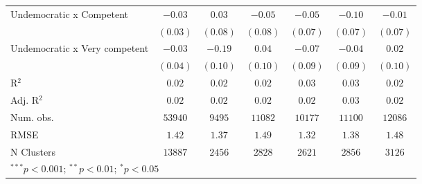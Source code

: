 \begin{table}[!htbp]
\begin{center}
\begin{tabular}{l c c c c c c}
Undemocratic x Competent        & $-0.03$       & $0.03$        & $-0.05$       & $-0.05$       & $-0.10$       & $-0.01$       \\
                                & $(0.03)$      & $(0.08)$      & $(0.08)$      & $(0.07)$      & $(0.07)$      & $(0.07)$      \\
Undemocratic x Very competent   & $-0.03$       & $-0.19$       & $0.04$        & $-0.07$       & $-0.04$       & $0.02$        \\
                                & $(0.04)$      & $(0.10)$      & $(0.10)$      & $(0.09)$      & $(0.09)$      & $(0.10)$      \\
\hline
R$^2$                           & $0.02$        & $0.02$        & $0.02$        & $0.03$        & $0.03$        & $0.02$        \\
Adj. R$^2$                      & $0.02$        & $0.02$        & $0.02$        & $0.02$        & $0.03$        & $0.02$        \\
Num. obs.                       & $53940$       & $9495$        & $11082$       & $10177$       & $11100$       & $12086$       \\
RMSE                            & $1.42$        & $1.37$        & $1.49$        & $1.32$        & $1.38$        & $1.48$        \\
N Clusters                      & $13887$       & $2456$        & $2828$        & $2621$        & $2856$        & $3126$        \\
\hline
\multicolumn{7}{l}{\scriptsize{$^{***}p<0.001$; $^{**}p<0.01$; $^{*}p<0.05$}}
\end{tabular}
\label{table_a2}
\end{center}
\end{table}
